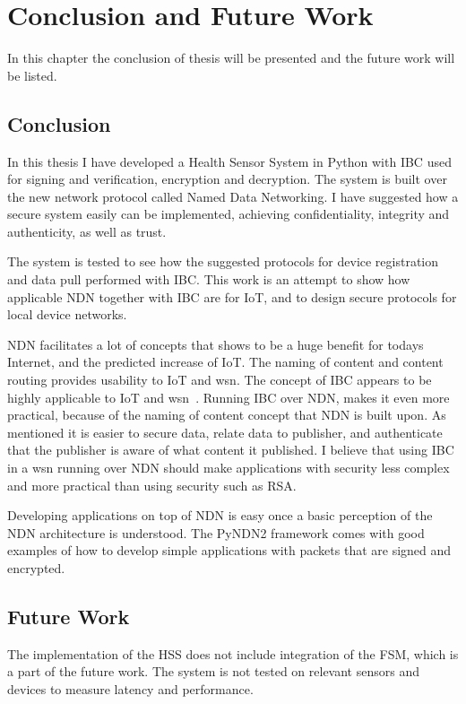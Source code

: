 \chapter{Conclusion and Future Work}\label{chp7:conclusion}
In this chapter the conclusion of thesis will be presented and the future work will be listed.

\section{Conclusion}
In this thesis I have developed a Health Sensor System in Python with \gls{IBC} used for signing and verification, encryption and decryption.
The system is built over the new network protocol called Named Data Networking.
I have suggested how a secure system easily can be implemented, achieving confidentiality, integrity and authenticity, as well as trust.

The system is tested to see how the suggested protocols for device registration and data pull performed with \gls{IBC}. 
This work is an attempt to show how applicable \gls{NDN} together with \gls{IBC} are for \gls{IoT}, and to design secure protocols for local device networks.

\gls{NDN} facilitates a lot of concepts that shows to be a huge benefit for todays Internet, and the predicted increase of \gls{IoT}.
The naming of content and content routing provides usability to \gls{IoT} and \gls{wsn}.
The concept of \gls{IBC} appears to be highly applicable to \gls{IoT} and \gls{wsn}~\cite{Patil:2012:SWS:2464778}.
Running \gls{IBC} over \gls{NDN}, makes it even more practical, because of the naming of content concept that \gls{NDN} is built upon. 
As mentioned it is easier to secure data, relate data to publisher, and authenticate that the publisher is aware of what content it published. 
I believe that using \gls{IBC} in a \gls{wsn} running over \gls{NDN} should make applications with security less complex and more practical than using security such as RSA. 

Developing applications on top of \gls{NDN} is easy once a basic perception of the \gls{NDN} architecture is understood.
The \gls{PyNDN2} framework comes with good examples of how to develop simple applications with packets that are signed and encrypted.

\section{Future Work}
The implementation of the \gls{HSS} does not include integration of the \gls{FSM}, which is a part of the future work.
The system is not tested on relevant sensors and devices to measure latency and performance.

